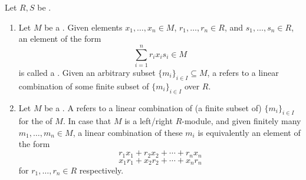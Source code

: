 \begin{definition} \label{definition:linear_combination_of_elements_in_a_module}
Let $R,S$ be . 
\begin{enumerate}
    \item Let $M$ be a . Given elements $x_1,\ldots,x_n \in M$, $r_1,\ldots,r_n \in R$, and $s_1,\ldots,s_n \in R$, an element of the form
    $$\sum_{i=1}^n r_i x_i s_i \in M$$
    is called a . Given an arbitrary subset $\{m_i\}_{i \in I} \subseteq M$, a  refers to a linear combination of some finite subset of $\{m_i\}_{i \in I}$ over $R$. 

    \item Let $M$ be a . A  refers to a linear combination of (a finite subset of) $\{m_i\}_{i \in I}$ for the  of $M$. In case that $M$ is a left/right $R$-module, and given finitely many $m_1,\ldots,m_n \in M$, a linear combination of these $m_i$ is equivalently an element of the form
    $$r_1 x_1 + r_2 x_2 + \cdots + r_n x_n$$
    $$x_1 r_1 + x_2 r_2 + \cdots + x_n r_n$$
    for $r_1,\ldots,r_n \in R$ respectively.
\end{enumerate}


\end{definition}